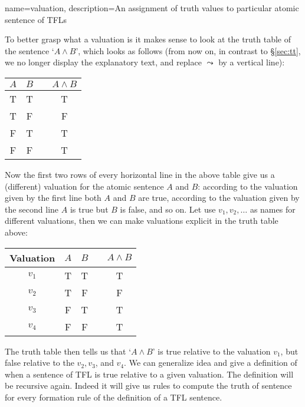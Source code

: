 
{
name=valuation,
description={An assignment of \glspl{truth value} to particular atomic \glspl{sentence of TFL}}
}

To better grasp what a valuation is it makes sense to look at the truth table of the sentence `$A\wedge B$', which looks as follows (from now on, in contrast to \S\ref{sec:tt}, we no longer display the explanatory text, and replace $\leadsto$ by a vertical line):

\begin{center}
\begin{tabular}{ccc|c}
$A$&$B$&&$A\wedge B$\\\hline
T & T && T\\
T & F && F\\
F & T && T\\
F & F && T
\end{tabular}
\end{center}

Now the first two rows of every horizontal line in the above table give us a (different) valuation for the atomic sentence $A$ and $B$: according to the valuation given by the first line both $A$ and $B$ are true, according to the valuation given by the second line $A$ is true but $B$ is false, and so on. Let use $v_1,v_2,\ldots$ as names for different valuations, then we can make valuations explicit in the truth table above:
\begin{center}
\begin{tabular}{c|ccc|c}
Valuation&$A$&$B$&&$A\wedge B$\\\hline
$v_1$&T & T && T\\
$v_2$&T & F && F\\
$v_3$&F & T && T\\
$v_4$&F & F && T
\end{tabular}
\end{center}
 
 The truth table then tells us that `$A\wedge B$' is true relative to the valuation $v_1$, but false relative to the $v_2,v_3$, and $v_4$. We can generalize idea and give a definition of when a sentence of TFL is true relative to a given valuation. The definition will be recursive again. Indeed it will give us rules to compute the truth of sentence for every formation rule of the definition of a TFL sentence.
 
